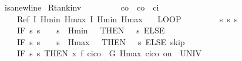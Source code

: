 \documentclass[envcountsame]{llncs}
\begin{document}
\begin{example}\label{ex:tank-rinv}
\begin{isabellebody}
isanewline
\isamarkupfalse%
\ R{\isacharunderscore}tank{\isacharunderscore}inv{\isacharcolon}\isanewline
\ \ \ {\isachardoublequoteopen}{}\ {\isasymle}\ {\isasymtau}{\isachardoublequoteclose}\ \ {\isachardoublequoteopen}{}\ {\isacharless}\ c\isactrlsub o{\isachardoublequoteclose}\ \ {\isachardoublequoteopen}c\isactrlsub o\ {\isacharless}\ c\isactrlsub i{\isachardoublequoteclose}\isanewline
\ \ \ {\isachardoublequoteopen}Ref\ {\isasymlceil}I\ Hmin\ Hmax{\isasymrceil}\ {\isasymlceil}I\ Hmin\ Hmax{\isasymrceil}\ {\isasymge}\isanewline
\ \ {\isacharparenleft}LOOP\ \isanewline
\ \ \ %
\isanewline
\ \ \ {\isacharparenleft}{\isacharparenleft}{}\ {\isacharcolon}{\isacharcolon}{\isacharequal}{\isacharparenleft}{\isasymlambda}s{\isachardot}{}{\isacharparenright}{\isacharparenright}{\isacharsemicolon}{\isacharparenleft}{}\ {\isacharcolon}{\isacharcolon}{\isacharequal}{\isacharparenleft}{\isasymlambda}s{\isachardot}\ s{\isachardollar}{}{\isacharparenright}{\isacharparenright}{\isacharsemicolon}\isanewline
\ \ \ {\isacharparenleft}IF\ {\isacharparenleft}{\isasymlambda}s{\isachardot}\ s{\isachardollar}{}\ {\isacharequal}\ {}\ {\isasymand}\ s{\isachardollar}{}\ {\isasymle}\ Hmin\ {\isacharplus}\ {}{\isacharparenright}\ THEN\ {\isacharparenleft}{}\ {\isacharcolon}{\isacharcolon}{\isacharequal}\ {\isacharparenleft}{\isasymlambda}s{\isachardot}{}{\isacharparenright}{\isacharparenright}\ ELSE\ \isanewline
\ \ \ {\isacharparenleft}IF\ {\isacharparenleft}{\isasymlambda}s{\isachardot}\ s{\isachardollar}{}\ {\isacharequal}\ {}\ {\isasymand}\ s{\isachardollar}{}\ {\isasymge}\ Hmax\ {\isacharminus}\ {}{\isacharparenright}\ THEN\ {\isacharparenleft}{}\ {\isacharcolon}{\isacharcolon}{\isacharequal}\ {\isacharparenleft}{\isasymlambda}s{\isachardot}{}{\isacharparenright}{\isacharparenright}\ ELSE\ skip{\isacharparenright}{\isacharparenright}{\isacharsemicolon}\isanewline
\ \ \ %
\isanewline
\ \ \ {\isacharparenleft}IF\ {\isacharparenleft}{\isasymlambda}s{\isachardot}\ s{\isachardollar}{}{\isacharequal}{}{\isacharparenright}\ THEN\ {\isacharparenleft}x{\isasymacute}{\isacharequal}\ f\ {\isacharparenleft}c\isactrlsub i{\isacharminus}c\isactrlsub o{\isacharparenright}\ {\isacharampersand}\ G\ Hmax\ {\isacharparenleft}c\isactrlsub i{\isacharminus}c\isactrlsub o{\isacharparenright}\ on\ {\isacharbraceleft}{}{\isachardot}{\isachardot}{\isasymtau}{\isacharbraceright}\ UNIV\ {\isacharat}\ {}\isanewline 

\end{isabellebody}
\end{example}
\end{document}
